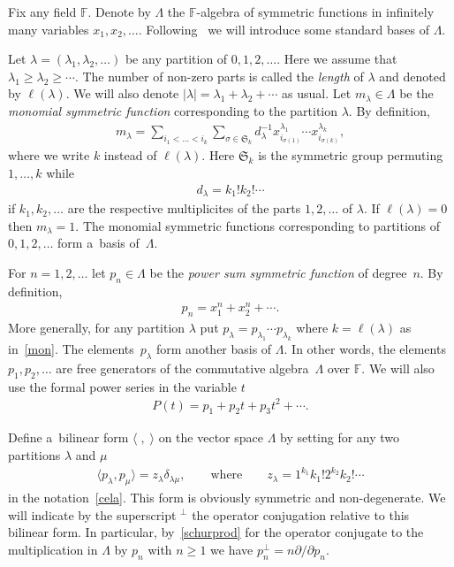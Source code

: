 \documentclass[11pt]{article}
\numberwithin{equation}{section}
\renewcommand\ge{\geqslant}
\begin{document}
Fix any f\/ield $\mathbb F$.
Denote by $\Lambda$ the $\mathbb F$-algebra of symmetric functions in inf\/initely many variables
$x_1,x_2,\ldots$.
Following~\cite{M} we will introduce some standard bases of $\Lambda$.

Let $\lambda=(\lambda_1,\lambda_2,\ldots)$ be any partition of $0,1,2,\ldots$.
Here we assume that $\lambda_1\ge\lambda_2\ge\cdots$.
The number of non-zero parts is called the {\it length} of $\lambda$ and denoted by $\ell(\lambda)$.
We will also denote $|\lambda|=\lambda_1+\lambda_2+\cdots$ as usual.
Let $m_\lambda\in\Lambda$ be the \textit{monomial symmetric function} corresponding to the partition
$\lambda$.
By def\/inition,
\begin{gather}
\label{mon}
m_\lambda=\sum_{i_1<\dots<i_k}
\sum_{\sigma\in\mathfrak{S}_k}d_\lambda^{-1}x_{i_{\sigma(1)}}^{\lambda_1}\cdots x_{i_{\sigma(k)}}^{\lambda_k},
\end{gather}
where we write $k$ instead of $\ell(\lambda)$.
Here $\mathfrak{S}_k$ is the symmetric group permuting $1,\ldots, k$ while
\begin{gather}
\label{cela}
d_\lambda=k_1!k_2!\cdots
\end{gather}
if $k_1, k_2,\ldots$ are the respective multiplicites of the parts $1,2,\ldots$ of $\lambda$.
If $\ell(\lambda)=0$ then $m_\lambda=1$.
The monomial symmetric functions corresponding to partitions of $0,1,2,\ldots$ form a~basis of~$\Lambda$.

For $n=1,2,\ldots$ let $p_n\in\Lambda$ be the \textit{power sum symmetric function} of degree~$n$.
By def\/inition,
\begin{gather}
\label{pon}
p_n=x_1^n+x_2^n+\cdots.
\end{gather}
More generally, for any partition $\lambda$ put $ p_\lambda=p_{\lambda_1}\cdots p_{\lambda_k} $ where
$k=\ell(\lambda)$ as in~\eqref{mon}.
The ele\-ments~$p_\lambda$ form another basis of $\Lambda$.
In other words, the elements $p_1,p_2,\ldots$ are free generators of the commutative algebra~$\Lambda$ over
$\mathbb F$.
We will also use the formal power series in the variable $t$
\begin{gather*}
P(t)=p_1+p_2t+p_3t^2+\cdots.
\end{gather*}

Def\/ine a~bilinear form $\langle\;,\;\rangle$ on the vector space $\Lambda$ by setting for any two
partitions $\lambda$ and $\mu$
\begin{gather}
\label{schurprod}
\langle p_\lambda,p_\mu\rangle=z_\lambda\delta_{\lambda\mu},
\qquad
\text{where}
\qquad
z_\lambda=1^{k_1}k_1!2^{k_2}k_2!\cdots
\end{gather}
in the notation~\eqref{cela}.
This form is obviously symmetric and non-degenerate.
We will indicate by the superscript ${}^\perp$ the operator conjugation relative to this bilinear form.
In particular, by~\eqref{schurprod} for the operator conjugate to the multiplication in $\Lambda$ by $p_n$
with $n\ge1$ we have $ p_n^{\perp}=n\partial /\partial p_n.
{}$
\end{document}
